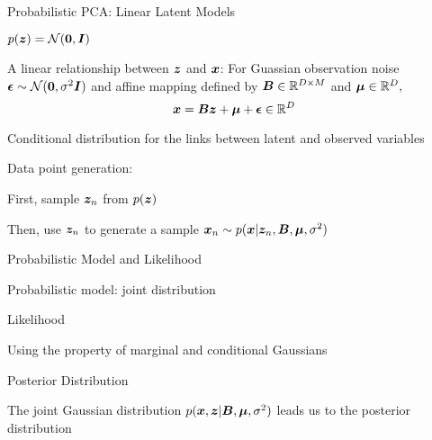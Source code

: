 \documentclass[handout,fleqn,aspectratio=169]{beamer}
\begin{document}
\begin{frame}{Probabilistic PCA: Linear Latent Models}

\plitemsep 0.07in

\bci 
\item $p(\bm{z}) = \mathcal N(\bm{0},\bm{I})$

\item A linear relationship between $\bm{z}$ and $\bm{x}$: For Guassian observation noise $\bm{\epsilon} \sim \mathcal N(\bm{0},\sigma^2 \bm{I})$ and affine mapping defined by $\bm{B} \in {\mathbb R}^{D \times M}$ and $\bm{\mu} \in {\mathbb R}^{D},$
$$
\bm{x} = \bm{B}\bm{z} + \bm{\mu} + \bm{\epsilon} \in {\mathbb R}^{D}
$$

\item Conditional distribution for the links between latent and observed variables
\item Data point generation: 
\bci
\item First, sample $\bm{z}_n$ from $p(\bm{z})$
\item Then, use $\bm{z}_n$ to generate a sample $\bm{x}_n \sim p(\bm{x}|\bm{z}_n, \bm{B}, \bm{\mu}, \sigma^2)$
\eci
\eci

\end{frame}

\begin{frame}{Probabilistic Model and Likelihood}

\plitemsep 0.07in

\bci 
\item Probabilistic model: joint distribution

\item Likelihood
\bci
\item Using the property of marginal and conditional Gaussians \hfill {}
\eci
\eci
\end{frame}

\begin{frame}{Posterior Distribution}

\plitemsep 0.07in

\bci 
\item The joint Gaussian distribution $p(\bm{x},\bm{z} | \bm{B}, \bm{\mu}, \sigma^2)$ leads us to the posterior distribution

\eci
\end{frame}
\end{document}

